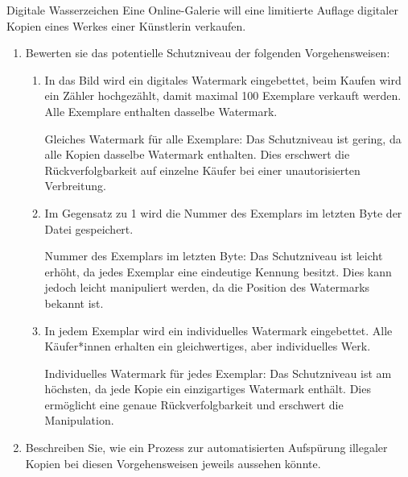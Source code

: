 \documentclass{article}
\begin{document}
\begin{exercise}{Digitale Wasserzeichen}
  Eine Online-Galerie will eine limitierte Auflage digitaler Kopien eines Werkes einer Künstlerin verkaufen.
  \begin{enumerate}
    \item Bewerten sie das potentielle Schutzniveau der folgenden Vorgehensweisen:
          \begin{enumerate}
            \item In das Bild wird ein digitales Watermark eingebettet, beim Kaufen wird ein Zähler hochgezählt, damit maximal 100 Exemplare verkauft werden. Alle Exemplare enthalten dasselbe Watermark.
                  \begin{solution}
                    Gleiches Watermark für alle Exemplare: Das Schutzniveau ist gering, da alle Kopien dasselbe Watermark enthalten. Dies erschwert die Rückverfolgbarkeit auf einzelne Käufer bei einer unautorisierten Verbreitung.
                  \end{solution}

            \item Im Gegensatz zu 1 wird die Nummer des Exemplars im letzten Byte der Datei gespeichert.
                  \begin{solution}
                    Nummer des Exemplars im letzten Byte: Das Schutzniveau ist leicht erhöht, da jedes Exemplar eine eindeutige Kennung besitzt. Dies kann jedoch leicht manipuliert werden, da die Position des Watermarks bekannt ist.
                  \end{solution}

            \item In jedem Exemplar wird ein individuelles Watermark eingebettet. Alle Käufer*innen erhalten ein gleichwertiges, aber individuelles Werk.
                  \begin{solution}
                    Individuelles Watermark für jedes Exemplar: Das Schutzniveau ist am höchsten, da jede Kopie ein einzigartiges Watermark enthält. Dies ermöglicht eine genaue Rückverfolgbarkeit und erschwert die Manipulation.
                  \end{solution}

          \end{enumerate}
    \item Beschreiben Sie, wie ein Prozess zur automatisierten Aufspürung illegaler Kopien bei diesen Vorgehensweisen jeweils aussehen könnte.


\end{enumerate}
\end{exercise}
\end{document}
